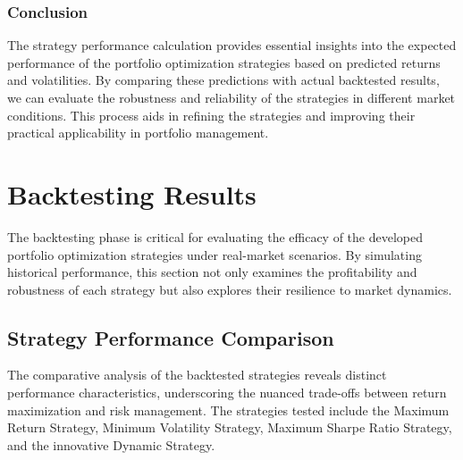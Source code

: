 \subsubsection{Conclusion}

The strategy performance calculation provides essential insights into the expected performance of the portfolio optimization strategies based on predicted returns and volatilities. By comparing these predictions with actual backtested results, we can evaluate the robustness and reliability of the strategies in different market conditions. This process aids in refining the strategies and improving their practical applicability in portfolio management.



\section{Backtesting Results}
The backtesting phase is critical for evaluating the efficacy of the developed portfolio optimization strategies under real-market scenarios. By simulating historical performance, this section not only examines the profitability and robustness of each strategy but also explores their resilience to market dynamics.
\subsection{Strategy Performance Comparison}
The comparative analysis of the backtested strategies reveals distinct performance characteristics, underscoring the nuanced trade-offs between return maximization and risk management. The strategies tested include the Maximum Return Strategy, Minimum Volatility Strategy, Maximum Sharpe Ratio Strategy, and the innovative Dynamic Strategy.

